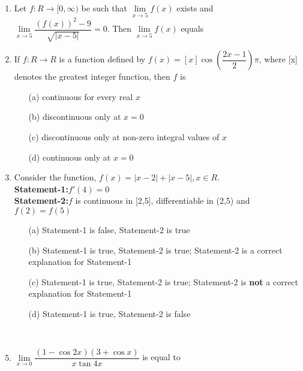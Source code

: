 \begin{enumerate}[label=\arabic*.,ref=\thesubsection.\theenumi]
\item Let $f:R \to [0,\infty)$ be such that $\lim\limits_{x \to 5}f(x)$ exists and $\lim\limits_{x \to 5}\dfrac{(f(x))^2-9}{\sqrt{|x-5|}}=0$. Then $\lim\limits_{x \to 5}f(x)$ equals
\begin{itemize}
\end{itemize}

\item If $f:R \to R$ is a function defined by $f(x)=[x]\cos\left(\dfrac{2x-1}{2}\right)\pi$, where [x] denotes the greatest integer function, then $f$ is
\begin{itemize}
\item[(a)] continuous for every real $x$
\item[(b)] discontinuous only at $x=0$
\item[(c)] discontinuous only at non-zero integral values of $x$
\item[(d)] continuous only at $x=0$\\
\end{itemize}

\item Consider the function, $f(x)=|x-2|+|x-5|, x \in R$.\\
\textbf{Statement-1:}$f'(4)=0$\\
\textbf{Statement-2:}$f$ is continuous in [2,5], differentiable in (2,5) and $f(2)=f(5)$
\begin{itemize}
\item[(a)] Statement-1 is false, Statement-2 is true
\item[(b)] Statement-1 is true, Statement-2 is true; Statement-2 is a correct explanation for Statement-1
\item[(c)] Statement-1 is true, Statement-2 is true; Statement-2 is \textbf{not} a correct explanation for Statement-1
\item[(d)] Statement-1 is true, Statement-2 is false
\end{itemize} \item[~]

\item $\lim\limits_{x \to 0}\dfrac{(1-\cos 2x)(3+\cos x)}{x\tan 4x}$ is equal to
\begin{itemize}
\end{itemize} \item[~]


\end{enumerate}
